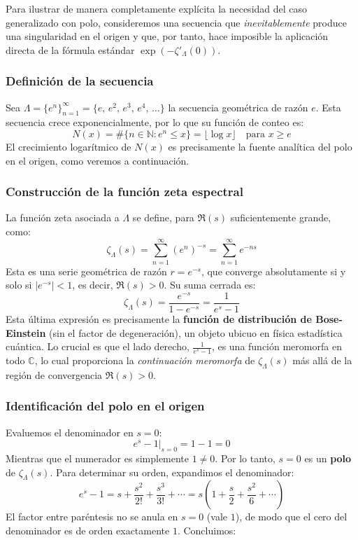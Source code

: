 Para ilustrar de manera completamente explícita la necesidad del caso generalizado con polo, consideremos una secuencia que \textit{inevitablemente} produce una singularidad en el origen y que, por tanto, hace imposible la aplicación directa de la fórmula estándar $\exp(-\zeta'_\Lambda(0))$.

\subsubsection*{Definición de la secuencia}

Sea $\Lambda = \{e^n\}_{n=1}^{\infty} = \{e,\, e^2,\, e^3,\, e^4,\, \ldots\}$ la secuencia geométrica de razón $e$. Esta secuencia crece exponencialmente, por lo que su función de conteo es:
$$ N(x) = \#\{n \in \mathbb{N} : e^n \le x\} = \lfloor \log x \rfloor \quad \text{para } x \ge e $$
El crecimiento logarítmico de $N(x)$ es precisamente la fuente analítica del polo en el origen, como veremos a continuación.

\subsubsection*{Construcción de la función zeta espectral}

La función zeta asociada a $\Lambda$ se define, para $\Re(s)$ suficientemente grande, como:
$$ \zeta_\Lambda(s) = \sum_{n=1}^{\infty} (e^n)^{-s} = \sum_{n=1}^{\infty} e^{-ns} $$
Esta es una serie geométrica de razón $r = e^{-s}$, que converge absolutamente si y solo si $|e^{-s}| < 1$, es decir, $\Re(s) > 0$. Su suma cerrada es:
$$ \zeta_\Lambda(s) = \frac{e^{-s}}{1 - e^{-s}} = \frac{1}{e^s - 1} $$
Esta última expresión es precisamente la \textbf{función de distribución de Bose-Einstein} (sin el factor de degeneración), un objeto ubicuo en física estadística cuántica. Lo crucial es que el lado derecho, $\frac{1}{e^s - 1}$, es una función meromorfa en todo $\mathbb{C}$, lo cual proporciona la \textit{continuación meromorfa} de $\zeta_\Lambda(s)$ más allá de la región de convergencia $\Re(s) > 0$.

\subsubsection*{Identificación del polo en el origen}

Evaluemos el denominador en $s = 0$:
$$ e^s - 1 \Big|_{s=0} = 1 - 1 = 0 $$
Mientras que el numerador es simplemente $1 \neq 0$. Por lo tanto, $s = 0$ es un \textbf{polo} de $\zeta_\Lambda(s)$. Para determinar su orden, expandimos el denominador:
$$ e^s - 1 = s + \frac{s^2}{2!} + \frac{s^3}{3!} + \cdots = s\left(1 + \frac{s}{2} + \frac{s^2}{6} + \cdots\right) $$
El factor entre paréntesis no se anula en $s=0$ (vale $1$), de modo que el cero del denominador es de orden exactamente $1$. Concluimos:

